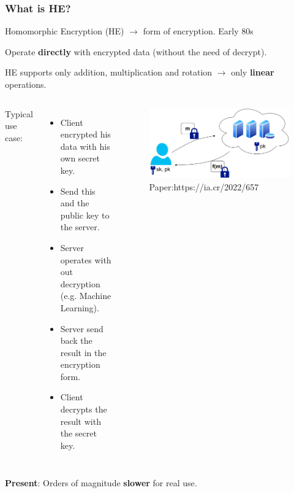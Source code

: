 \documentclass[10pt,handout]{beamer}
\begin{document}
\begin{frame}
\frametitle{What is HE?}

    Homomorphic Encryption (HE) $\rightarrow$ form of encryption. Early 80s
\vspace{-0.3cm}

    Operate \textbf{directly} with encrypted data (without the need of decrypt).
\vspace{-0.3cm}

    HE supports only addition, multiplication and rotation $\rightarrow$ only \textbf{linear} operations.
\vspace{0.3cm}
  \begin{columns}
Typical use case:
\begin{itemize}
    \item Client encrypted his data with his own secret key.
    \item Send this and the public key to the server.
    \item Server operates with out decryption (e.g. Machine Learning).
    \item Server send back the result in the encryption form.
    \item Client decrypts the result with the secret key.
\end{itemize}



\begin{figure}[h!]
    \centering
    \includegraphics[scale=0.1]{fhe.jpg}
    \caption{Paper:https://ia.cr/2022/657}
\end{figure}
\end{columns}
 \vspace{-0.3cm}



 \pause
    \textbf{Present}: Orders of magnitude \textbf{slower} for real use.


\end{frame}
\end{document}
